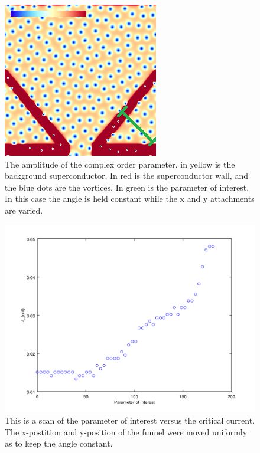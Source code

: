 \begin{figure}[htbp]
\begin{center}
\includegraphics[scale=.50]{normalAngle.png}
\caption{ The amplitude of the complex order parameter. in yellow is the background superconductor, In red is the superconductor wall, and the blue dots are the vortices. In green is the parameter of interest. In this case the angle is held constant while the x and y attachments are varied. }
\label{normalAngle}
\end{center}
\end{figure}

\begin{figure}[htbp]
\begin{center}
\includegraphics[scale=.50]{constantAngle.png}
\caption{ This is a scan of the parameter of interest versus the critical current. The x-postition and y-position of the funnel were moved uniformly as to keep the angle constant. }
\label{constantAngle}
\end{center}
\end{figure}


